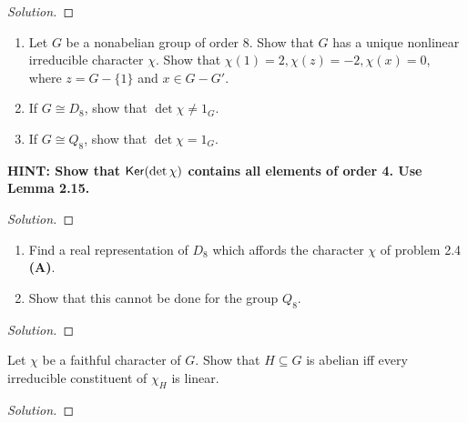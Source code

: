 \begin{proof}[Solution]

\end{proof}

\newpage

\begin{problem}[2.4]
  \hfill
\begin{enumerate}[font=\normalfont,label=\textbf{(\Alph*)}]


  \item Let $G$ be a nonabelian group of order 8. Show that $G$ has a unique nonlinear irreducible character $\chi$. Show that $\chi(1) = 2, \chi(z) = -2, \chi(x) = 0$, where $z = G-\{1\}$ and $x\in G-G'$.
  \item If $G \cong D_8$, show that $\det{\chi} \neq 1_G$.
  \item If $G \cong Q_8$, show that $\det{\chi} = 1_G$.
\end{enumerate}
\textbf{HINT: Show that $\mathsf{Ker}(\det{\chi})$ contains all elements of order 4. Use Lemma 2.15.}
\end{problem}

\begin{proof}[Solution]

\end{proof}

\newpage
\begin{problem}[2.5]
\hfill

\begin{enumerate}[font=\normalfont,label=\textbf{(\Alph*)}]
  \item Find a real representation of $D_8$ which affords the character $\chi$ of problem 2.4 \textbf{(A)}.
  \item Show that this cannot be done for the group $Q_8$.
\end{enumerate}
\end{problem}

\begin{proof}[Solution]

\end{proof}

\newpage
\begin{problem}[2.8]
Let $\chi$ be a faithful character of $G$. Show that $H \subseteq G$ is abelian iff every irreducible constituent of $\chi_H$ is linear.
\end{problem}

\begin{proof}[Solution]

\end{proof}

